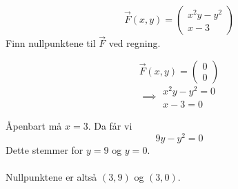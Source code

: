 $$\vec{F}(x,y) = \begin{pmatrix} x^2y-y^2 \\ x-3 \end{pmatrix}$$
Finn nullpunktene til $\vec{F}$ ved regning.

$$\vec{F}(x,y) = \begin{pmatrix} 0 \\ 0 \end{pmatrix}$$
$$\implies \begin{matrix} x^2y-y^2=0 \\ x-3=0 \end{matrix}$$

Åpenbart må $x=3$. Da får vi
$$9y-y^2 = 0$$
Dette stemmer for $y=9$ og $y=0$.
\\\\
Nullpunktene er altså $(3,9)$ og $(3,0)$.
